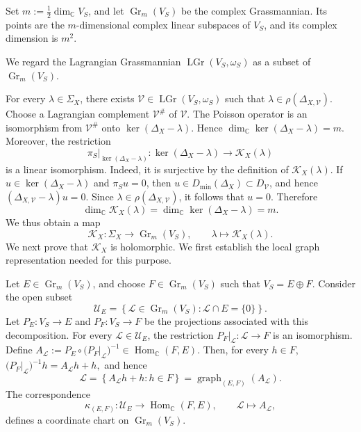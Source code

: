 \documentclass[10pt,a4paper]{amsart}
\numberwithin{equation}{section} \numberwithin{figure}{section}
\renewcommand*{\to}{\rightarrow}
\newcommand{\mb}[1]{\mathbb{#1}} %
\newcommand{\mc}[1]{\mathcal{#1}}
\begin{document}
Set \(m:=\frac12\dim_{\mb C}V_S\), and let
\(\operatorname{Gr}_m(V_S)\) be the complex Grassmannian. Its points
are the \(m\)-dimensional complex linear subspaces of \(V_S\), and its
complex dimension is \(m^2\).

We regard the Lagrangian Grassmannian
\(\operatorname{LGr}(V_S,\omega_S)\) as a subset of
\(\operatorname{Gr}_m(V_S)\).

For every \(\lambda\in\Sigma_X\), there exists
\(\mc V\in\operatorname{LGr}(V_S,\omega_S)\) such that
\(\lambda\in\rho(\Delta_{X,\mc V})\). Choose a Lagrangian complement
\(\mc V^\#\) of \(\mc V\). The Poisson operator is an isomorphism
from \(\mc V^\#\) onto \(\ker(\Delta_X-\lambda)\). Hence
\(\dim_{\mb C}\ker(\Delta_X-\lambda)=m\).
Moreover, the restriction
\[
    \pi_S\big|_{\ker(\Delta_X-\lambda)}:
    \ker(\Delta_X-\lambda)
    \longrightarrow
    \mc K_X(\lambda)
\]
is a linear isomorphism. Indeed, it is surjective by the definition of
\(\mc K_X(\lambda)\). If
\(u\in\ker(\Delta_X-\lambda)\) and \(\pi_Su=0\), then
\(u\in D_{\min}(\Delta_X)\subset D_{\mc V}\), and hence
\(
    (\Delta_{X,\mc V}-\lambda)u=0.
\)
Since \(\lambda\in\rho(\Delta_{X,\mc V})\), it follows that \(u=0\).
Therefore
\[
    \dim_{\mb C}\mc K_X(\lambda)
    =
    \dim_{\mb C}\ker(\Delta_X-\lambda)
    =
    m.
\]
We thus obtain a map
\[
    \mc K_X:
    \Sigma_X
    \longrightarrow
    \operatorname{Gr}_m(V_S),
    \qquad
    \lambda
    \longmapsto
    \mc K_X(\lambda).
\]
We next prove that \(\mc K_X\) is holomorphic. We first establish the
local graph representation needed for this purpose.


Let \(E\in\operatorname{Gr}_m(V_S)\), and choose
\(F\in\operatorname{Gr}_m(V_S)\) such that
\(V_S=E\oplus F\). Consider the open subset
\[
    \mc U_E
    =
    \left\{
        \mc L\in\operatorname{Gr}_m(V_S):
        \mc L\cap E=\{0\}
    \right\}.
\]
Let \(P_E:V_S\to E\) and \(P_F:V_S\to F\) be the projections
associated with this decomposition.
For every \(\mc L\in\mc U_E\), the restriction
\(P_F|_{\mc L}:\mc L\to F\) is an isomorphism. Define
\(
    A_{\mc L}
    :=
    P_E\circ
    \bigl(P_F|_{\mc L}\bigr)^{-1}
    \in
    \operatorname{Hom}_{\mb C}(F,E).
\)
Then, for every \(h\in F\),
\(
    \bigl(P_F|_{\mc L}\bigr)^{-1}h
    =
    A_{\mc L}h+h,
\)
and hence
\[
    \mc L
    =
    \left\{
        A_{\mc L}h+h:
        h\in F
    \right\}
    =
    \operatorname{graph}_{(E,F)}(A_{\mc L}).
\]
The correspondence
\[
    \kappa_{(E,F)}:
    \mc U_E
    \longrightarrow
    \operatorname{Hom}_{\mb C}(F,E),
    \qquad
    \mc L
    \longmapsto
    A_{\mc L},
\]
defines a coordinate chart on
\(\operatorname{Gr}_m(V_S)\).
\end{document}
